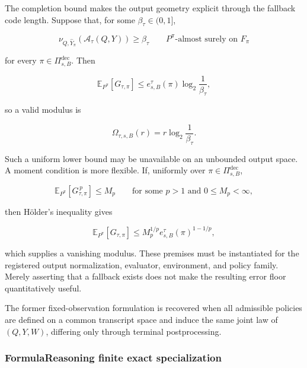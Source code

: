 \documentclass[10pt]{article} %
\providecommand{\1}{\mathbf{1}}  %
\theoremstyle{remark}
\theoremstyle{definition}
\begin{document}
The completion bound makes the output geometry explicit through the fallback code length. Suppose that, for some $\beta_\tau\in(0,1]$,

\begin{equation}
\nu_{Q,\widehat Y_\pi}\!\left(
\mathcal A_\tau(Q,Y)
\right)
\geq
\beta_\tau
\qquad
P^\pi\text{-almost surely on }F_\pi
\label{eq:uniform-fallback-small-ball}
\end{equation}

for every $\pi\in\Pi_{s,B}^{\mathrm{dec}}$. Then

\begin{equation}
\mathbb E_{P^\pi}\!\left[
G_{\tau,\pi}
\right]
\leq
e_{s,B}^{\tau}(\pi)
\log_2\frac{1}{\beta_\tau},
\end{equation}

so a valid modulus is

\begin{equation}
\Omega_{\tau,s,B}(r)
=
r\log_2\frac{1}{\beta_\tau}.
\label{eq:uniform-small-ball-modulus}
\end{equation}

Such a uniform lower bound may be unavailable on an unbounded output space. A moment condition is more flexible. If, uniformly over $\pi\in\Pi_{s,B}^{\mathrm{dec}}$,

\begin{equation}
\mathbb E_{P^\pi}\!\left[
G_{\tau,\pi}^{\,p}
\right]
\leq
M_p
\qquad
\text{for some }p>1\text{ and }0\leq M_p<\infty,
\label{eq:fallback-moment-condition}
\end{equation}

then H\"older's inequality gives

\begin{equation}
\mathbb E_{P^\pi}\!\left[
G_{\tau,\pi}
\right]
\leq
M_p^{1/p}
e_{s,B}^{\tau}(\pi)^{1-1/p},
\label{eq:fallback-moment-modulus}
\end{equation}

which supplies a vanishing modulus. These premises must be instantiated for the registered output normalization, evaluator, environment, and policy family. Merely asserting that a fallback exists does not make the resulting error floor quantitatively useful.

The former fixed-observation formulation is recovered when all admissible policies are defined on a common transcript space and induce the same joint law of $(Q,Y,W)$, differing only through terminal postprocessing.

\subsubsection{FormulaReasoning finite exact specialization}
\label{subsubsec:formula-reasoning-finite-specialization}
\end{document}
